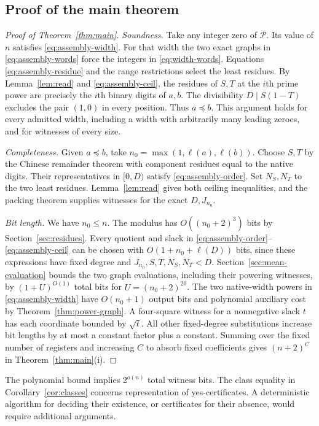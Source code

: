 \documentclass[11pt,letterpaper]{article}
\numberwithin{equation}{section}
\begin{document}
\subsection{Proof of the main theorem}
\begin{proof}[Proof of Theorem~\ref{thm:main}]
\emph{Soundness.} Take any integer zero of $\mathcal P$. Its value of $n$ satisfies \eqref{eq:assembly-width}. For that width the two exact graphs in \eqref{eq:assembly-words} force the integers in \eqref{eq:width-words}. Equations \eqref{eq:assembly-residue} and the range restrictions select the least residues. By Lemma~\ref{lem:read} and \eqref{eq:assembly-ceil}, the residues of $S,T$ at the $i$th prime power are precisely the $i$th binary digits of $a,b$. The divisibility $D\mid S(1-T)$ excludes the pair $(1,0)$ in every position. Thus $a\preceq b$. This argument holds for every admitted width, including a width with arbitrarily many leading zeroes, and for witnesses of every size.

\emph{Completeness.} Given $a\preceq b$, take $n_0=\max(1,\ell(a),\ell(b))$. Choose $S,T$ by the Chinese remainder theorem with component residues equal to the native digits. Their representatives in $[0,D)$ satisfy \eqref{eq:assembly-order}. Set $N_S,N_T$ to the two least residues. Lemma~\ref{lem:read} gives both ceiling inequalities, and the packing theorem supplies witnesses for the exact $D,J_{n_0}$.

\emph{Bit length.} We have $n_0\le n$. The modulus has $O((n_0+2)^3)$ bits by Section~\ref{sec:residues}. Every quotient and slack in \eqref{eq:assembly-order}--\eqref{eq:assembly-ceil} can be chosen with $O(1+n_0+\ell(D))$ bits, since these expressions have fixed degree and $J_{n_0},S,T,N_S,N_T<D$. Section~\ref{sec:mean-evaluation} bounds the two graph evaluations, including their powering witnesses, by $(1+U)^{O(1)}$ total bits for $U=(n_0+2)^{20}$. The two native-width powers in \eqref{eq:assembly-width} have $O(n_0+1)$ output bits and polynomial auxiliary cost by Theorem~\ref{thm:power-graph}. A four-square witness for a nonnegative slack $t$ has each coordinate bounded by $\sqrt t$. All other fixed-degree substitutions increase bit lengths by at most a constant factor plus a constant. Summing over the fixed number of registers and increasing $C$ to absorb fixed coefficients gives $(n+2)^C$ in Theorem~\ref{thm:main}(i).
\end{proof}
The polynomial bound implies $2^{o(n)}$ total witness bits. The class equality in Corollary~\ref{cor:classes} concerns representation of yes-certificates. A deterministic algorithm for deciding their existence, or certificates for their absence, would require additional arguments.
\end{document}
